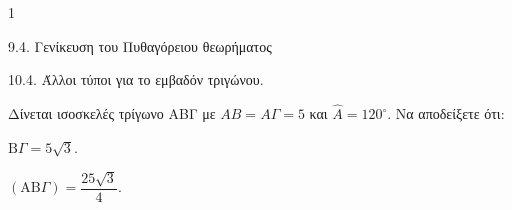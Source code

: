 \begin{ylh}{1}
    \item 9.4. Γενίκευση του Πυθαγόρειου θεωρήματος
    \item 10.4. Άλλοι τύποι για το εμβαδόν τριγώνου.
\end{ylh}
Δίνεται ισοσκελές τρίγωνο ΑΒΓ με $AB=A\Gamma=5$ και $\hat{A} = 120^\circ$. Να αποδείξετε ότι:
\begin{alist}
\item $\text{B}\Gamma = 5\sqrt{3}$. 
\item $(\text{AB}\Gamma) = \dfrac{25\sqrt{3}}{4}$. 
\end{alist}